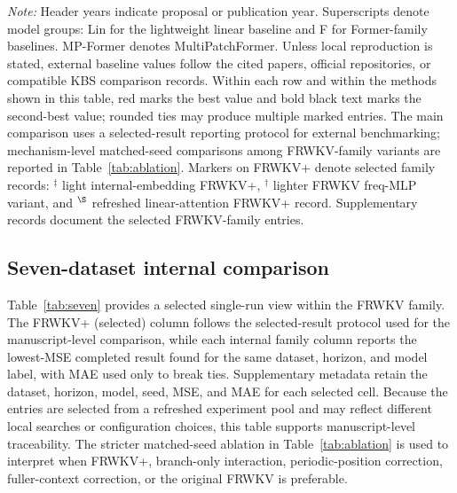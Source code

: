 \documentclass[a4paper,fleqn]{cas-sc}
\begin{document}
\begin{table}[t]
\begin{minipage}{\textwidth}
\footnotesize \emph{Note:} Header years indicate proposal or publication year. Superscripts denote model groups: Lin for the lightweight linear baseline and F for Former-family baselines. MP-Former denotes MultiPatchFormer. Unless local reproduction is stated, external baseline values follow the cited papers, official repositories, or compatible KBS comparison records. Within each row and within the methods shown in this table, red marks the best value and bold black text marks the second-best value; rounded ties may produce multiple marked entries. The main comparison uses a selected-result reporting protocol for external benchmarking; mechanism-level matched-seed comparisons among FRWKV-family variants are reported in Table~\ref{tab:ablation}. Markers on FRWKV+ denote selected family records: $^\ddagger$ light internal-embedding FRWKV+, $^\dagger$ lighter FRWKV freq-MLP variant, and $^\S$ refreshed linear-attention FRWKV+ record. Supplementary records document the selected FRWKV-family entries.
\end{minipage}
\end{table}

\subsection{Seven-dataset internal comparison}
Table~\ref{tab:seven} provides a selected single-run view within the FRWKV family. The FRWKV+ (selected) column follows the selected-result protocol used for the manuscript-level comparison, while each internal family column reports the lowest-MSE completed result found for the same dataset, horizon, and model label, with MAE used only to break ties. Supplementary metadata retain the dataset, horizon, model, seed, MSE, and MAE for each selected cell. Because the entries are selected from a refreshed experiment pool and may reflect different local searches or configuration choices, this table supports manuscript-level traceability. The stricter matched-seed ablation in Table~\ref{tab:ablation} is used to interpret when FRWKV+, branch-only interaction, periodic-position correction, fuller-context correction, or the original FRWKV is preferable.
\end{document}
